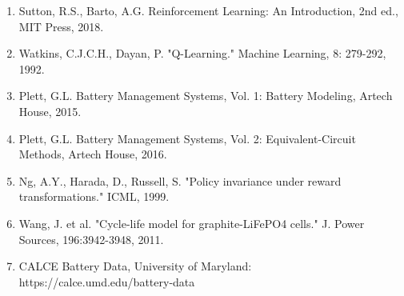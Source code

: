 \documentclass[11pt,a4paper]{article}
\begin{document}
\begin{enumerate}
  \item Sutton, R.S., Barto, A.G. Reinforcement Learning: An Introduction, 2nd ed., MIT Press, 2018.
  \item Watkins, C.J.C.H., Dayan, P. "Q-Learning." Machine Learning, 8: 279-292, 1992.
  \item Plett, G.L. Battery Management Systems, Vol. 1: Battery Modeling, Artech House, 2015.
  \item Plett, G.L. Battery Management Systems, Vol. 2: Equivalent-Circuit Methods, Artech House, 2016.
  \item Ng, A.Y., Harada, D., Russell, S. "Policy invariance under reward transformations." ICML, 1999.
  \item Wang, J. et al. "Cycle-life model for graphite-LiFePO4 cells." J. Power Sources, 196:3942-3948, 2011.
  \item CALCE Battery Data, University of Maryland: https://calce.umd.edu/battery-data
\end{enumerate}
\end{document}
